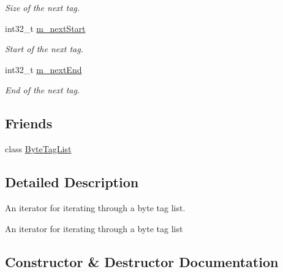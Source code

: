\begin{DoxyCompactItemize}
\begin{DoxyCompactList}\small\item\em Size of the next tag. \end{DoxyCompactList}\item 
int32\+\_\+t \hyperlink{classns3_1_1ByteTagList_1_1Iterator_a6b24dab16b41ceda94847795a556c29b}{m\+\_\+next\+Start}
\begin{DoxyCompactList}\small\item\em Start of the next tag. \end{DoxyCompactList}\item 
int32\+\_\+t \hyperlink{classns3_1_1ByteTagList_1_1Iterator_a53fc6ccb52767deef09ae800ed6e8358}{m\+\_\+next\+End}
\begin{DoxyCompactList}\small\item\em End of the next tag. \end{DoxyCompactList}\end{DoxyCompactItemize}
\subsection*{Friends}
\begin{DoxyCompactItemize}
\item 
class \hyperlink{classns3_1_1ByteTagList_1_1Iterator_a638c63b97c2e0e6a3bea307fe39c6093}{Byte\+Tag\+List}
\end{DoxyCompactItemize}


\subsection{Detailed Description}
An iterator for iterating through a byte tag list. 

An iterator for iterating through a byte tag list 

\subsection{Constructor \& Destructor Documentation}
